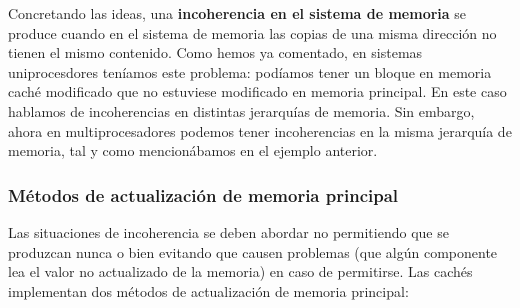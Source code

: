 Concretando las ideas, una \textbf{incoherencia en el sistema de memoria} se produce cuando en el sistema de memoria las copias de una misma dirección no tienen el mismo contenido. Como hemos ya comentado, en sistemas uniprocesdores teníamos este problema: podíamos tener un bloque en memoria caché modificado que no estuviese modificado en memoria principal. En este caso hablamos de incoherencias en distintas jerarquías de memoria. Sin embargo, ahora en multiprocesadores podemos tener incoherencias en la misma jerarquía de memoria, tal y como mencionábamos en el ejemplo anterior.

\subsubsection{Métodos de actualización de memoria principal}
Las situaciones de incoherencia se deben abordar no permitiendo que se produzcan nunca o bien evitando que causen problemas (que algún componente lea el valor no actualizado de la memoria) en caso de permitirse. Las cachés implementan dos métodos de actualización de memoria principal:
